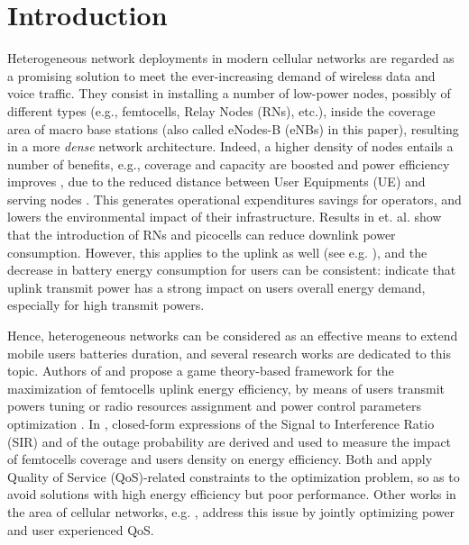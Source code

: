 \documentclass[draftcls,onecolumn]{IEEEtran}
\theoremstyle{plain}
\theoremstyle{definition}
\begin{document}
\section{Introduction}



Heterogeneous network deployments in modern cellular networks are regarded as a promising solution to meet the ever-increasing demand of wireless data and voice traffic. They consist in installing a number of low-power nodes, possibly of different types (e.g., femtocells, Relay Nodes (RNs), etc.), inside the coverage area of macro base stations (also called eNodes-B (eNBs) in this paper), resulting in a more {\it dense} network architecture.
Indeed, a higher density of nodes entails a number of benefits, e.g., coverage and capacity are boosted \cite{relays_pabst} 
and power efficiency improves \cite{hou}, due to the reduced distance between User Equipments (UE) and serving nodes \cite{hasan}. This generates operational expenditures savings for operators, and lowers the environmental impact of their infrastructure.    
Results in \cite{hou, saleh12} et. al. show that the introduction of RNs and picocells can reduce downlink power consumption. However, this applies to the uplink as well (see e.g. \cite{Zhao,res_opt}), and the decrease in battery energy consumption for users can be consistent: \cite{uplink_consumption,uplink_consumption_CA} indicate that uplink transmit power has a strong impact on users overall energy demand, especially for high transmit powers.   

Hence, heterogeneous networks can be considered as an effective means to extend mobile users batteries duration, and several research works are dedicated to this topic. Authors of \cite{Zhao} and \cite{Chen} propose a game theory-based framework for the maximization of femtocells uplink energy efficiency, by means of users transmit powers tuning \cite{Zhao} or radio resources assignment and power control parameters optimization \cite{Chen}. In \cite{Zhang}, closed-form expressions of the Signal to Interference Ratio (SIR) and of the outage probability are derived and used to measure the impact of femtocells coverage and users density on energy efficiency. Both \cite{Zhao} and \cite{Chen} apply Quality of Service (QoS)-related constraints to the optimization problem, so as to avoid solutions with high energy efficiency but poor performance. Other works in the area of cellular networks, e.g. \cite{son}, address this issue by jointly optimizing power and user experienced QoS. 
\end{document}
